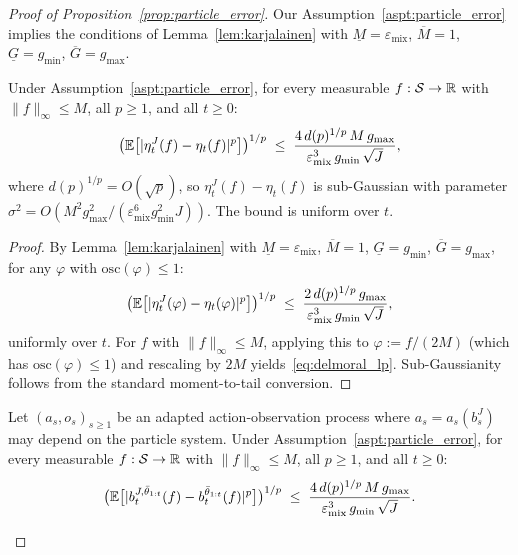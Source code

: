 \begin{proof}[Proof of Proposition~\ref{prop:particle_error}]
    Our Assumption~\ref{aspt:particle_error} implies the conditions of Lemma~\ref{lem:karjalainen} with $\underline M=\varepsilon_{\mathrm{mix}}$, $\overline M=1$, $\underline G=g_{\min}$, $\overline G=g_{\max}$.

    \begin{prop}\label{cor:pf_test_fn}
    Under Assumption~\ref{aspt:particle_error}, for every measurable $f:{\mathcal{S}}\to{\mathbb{R}}$ with $\|f\|_\infty\le M$, all $p\ge 1$, and all $t\ge 0$:
    \begin{equation}\label{eq:delmoral_lp}
    \bigl(\mathbb{E}\bigl[|\eta_t^J(f)-\eta_t(f)|^p\bigr]\bigr)^{1/p}
    \;\le\;
    \frac{4\,d(p)^{1/p}\,M\,g_{\max}}{\varepsilon_{\mathrm{mix}}^3\,g_{\min}\,\sqrt{J}},
    \end{equation}
    where $d(p)^{1/p}=O(\sqrt{p})$, so $\eta_t^J(f)-\eta_t(f)$ is sub-Gaussian with parameter $\sigma^2=O(M^2 g_{\max}^2/(\varepsilon_{\mathrm{mix}}^6 g_{\min}^2 J))$. The bound is uniform over $t$.
    \end{prop}

    \begin{proof}
    By Lemma~\ref{lem:karjalainen} with $\underline M=\varepsilon_{\mathrm{mix}}$, $\overline M=1$, $\underline G=g_{\min}$, $\overline G=g_{\max}$, for any $\varphi$ with $\mathrm{osc}(\varphi)\le 1$: 
    \[
    \bigl(\mathbb{E}\bigl[|\eta_t^J(\varphi)-\eta_t(\varphi)|^p\bigr]\bigr)^{1/p}
    \;\le\;
    \frac{2\,d(p)^{1/p}\,g_{\max}}{\varepsilon_{\mathrm{mix}}^3\,g_{\min}\,\sqrt{J}},
    \]
    uniformly over $t$. For $f$ with $\|f\|_\infty\le M$, applying this to $\varphi:=f/(2M)$ (which has $\mathrm{osc}(\varphi)\le 1$) and rescaling by $2M$ yields~\eqref{eq:delmoral_lp}. Sub-Gaussianity follows from the standard moment-to-tail conversion.
    \end{proof}

    \begin{lem}\label{lem:adaptive_conditioning}
    Let $(a_s,o_s)_{s\ge 1}$ be an adapted action-observation process where $a_s=a_s(b_s^J)$ may depend on the particle system. Under Assumption~\ref{aspt:particle_error}, for every measurable $f:{\mathcal{S}}\to{\mathbb{R}}$ with $\|f\|_\infty\le M$, all $p\ge 1$, and all $t\ge 0$:
    \begin{equation}\label{eq:unconditional_lp}
    \bigl(\mathbb{E}\bigl[|b_t^{J,\bar\theta_{1:t}}(f)-b_t^{\bar\theta_{1:t}}(f)|^p\bigr]\bigr)^{1/p}
    \;\le\;
    \frac{4\,d(p)^{1/p}\,M\,g_{\max}}{\varepsilon_{\mathrm{mix}}^3\,g_{\min}\,\sqrt{J}}.
    \end{equation}
    \end{lem}


\end{proof}
